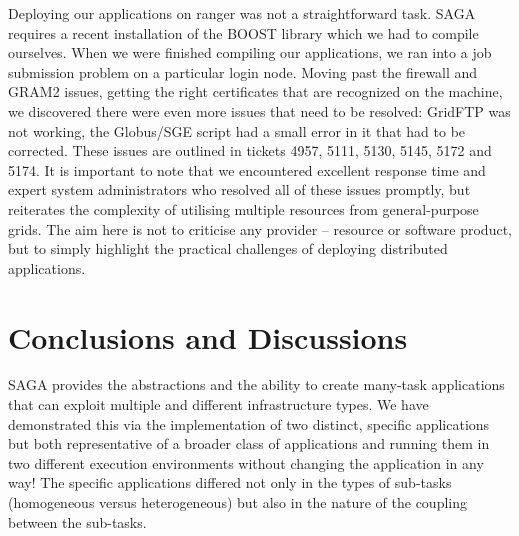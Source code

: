 \documentclass[conference,final]{IEEEtran}
\newcommand{\up}{\vspace*{-1em}}
\newcommand{\upp}{\vspace*{-0.5em}}
\newcommand{\jhanote}[1]{ {\textcolor{red} { ***SJ: #1 }}}
\newcommand{\jhanote}[1]{}
\begin{document}
Deploying our applications on ranger was not a straightforward task.
SAGA requires a recent installation of the BOOST library which we had
to compile ourselves. When we were finished compiling our
applications, we ran into a job submission problem on a particular
login node. %
Moving past the firewall and GRAM2 issues, getting the right
certificates that are recognized on the machine, we discovered there
were even more issues that need to be resolved: GridFTP was not
working, the Globus/SGE script had a small error in it that had to be
corrected.  These issues are outlined in tickets 4957, 5111, 5130,
5145, 5172 and 5174. It is important to note that we encountered
excellent response time and expert system administrators who resolved
all of these issues promptly, but reiterates the complexity of
utilising multiple resources from general-purpose grids.  The aim here
is not to criticise any provider -- resource or software product, but
to simply highlight the practical challenges of deploying distributed
applications.




\up\upp

\section{Conclusions and Discussions}

\up\upp

SAGA provides the abstractions and the ability to create many-task
applications that can exploit multiple and different infrastructure
types.  We have demonstrated this via the implementation of two
distinct, specific applications but both representative of a broader
class of applications and running them in two different execution
environments without changing the application in any way! The specific
applications differed not only in the types of sub-tasks (homogeneous
versus heterogeneous) but also in the nature of the coupling between
the sub-tasks.
  
\end{document}
